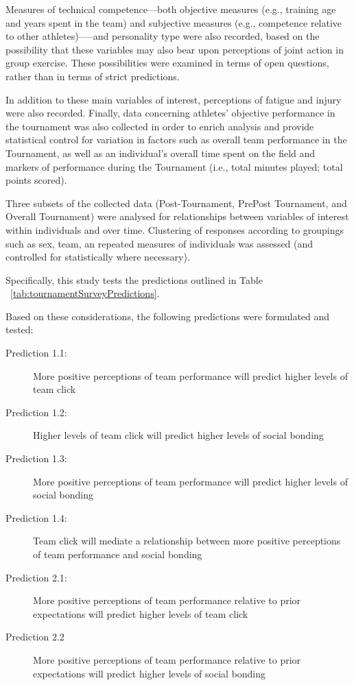 \begin{CJK}{UTF8}{gbsn}
Measures of technical competence---both objective measures (e.g., training age and years spent in the team) and subjective measures (e.g., competence relative to other athletes)—--and personality type were also recorded, based on the possibility that these variables may also bear upon perceptions of joint action in group exercise.  These possibilities were examined in terms of open questions, rather than in terms of strict predictions.

In addition to these main variables of interest, perceptions of fatigue and injury were also recorded.  Finally, data concerning athletes' objective performance in the tournament was also collected in order to enrich analysis and provide statistical control for variation in factors such as overall team performance in the Tournament, as well as an individual's overall time spent on the field and markers of performance during the Tournament (i.e., total minutes played; total points scored).

Three subsets of the collected data (Post-Tournament, PrePost Tournament, and Overall Tournament) were analysed for relationships between variables of interest within individuals and over time.  Clustering of responses according to groupings such as sex, team, an repeated measures of individuals was assessed (and controlled for statistically where necessary).

Specifically, this study tests the predictions outlined in Table ~\ref{tab:tournamentSurveyPredictions}.





Based on these considerations, the following predictions were formulated and tested:
      \begin{description}
        \item[Prediction 1.1:] More positive perceptions of team performance will predict higher levels of team click
        \item[Prediction 1.2:] Higher levels of team click will predict higher levels of social bonding
        \item[Prediction 1.3:] More positive perceptions of team performance will predict higher levels of social bonding
        \item[Prediction 1.4:] Team click will mediate a relationship between more positive perceptions of team performance and social bonding
        \item[Prediction 2.1:] More positive perceptions of team performance relative to prior expectations will predict higher levels of team click
        \item[Prediction 2.2] More positive perceptions of team performance relative to prior expectations will predict higher levels of social bonding
      \end{description}





\end{CJK}
